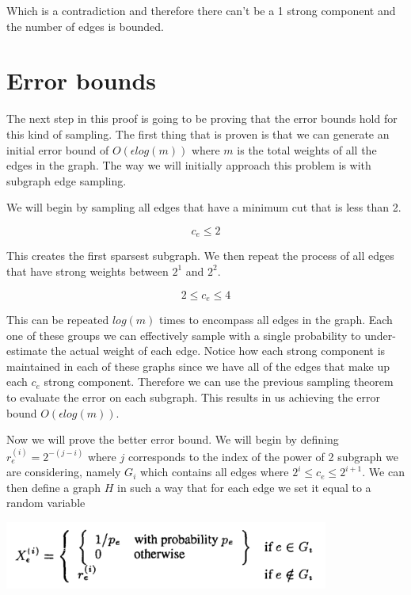 \documentclass[11pt]{article}
\begin{document}
Which is a contradiction and therefore there can't be a 1 strong component and the number of edges is bounded. 

\section{Error bounds}

The next step in this proof is going to be proving that the error bounds hold for this kind of sampling. The first thing that is proven is that we can generate an initial error bound of $O(\epsilon log(m))$ where $m$ is the total weights of all the edges in the graph. The way we will initially approach this problem is with subgraph edge sampling.

We will begin by sampling all edges that have a minimum cut that is less than 2.

\begin{equation}
    c_e \leq 2
\end{equation}

This creates the first sparsest subgraph. We then repeat the process of all edges that have strong weights between $2^1$ and $2^2$.

\begin{equation}
    2 \leq c_e \leq 4
\end{equation}

This can be repeated $log(m)$ times to encompass all edges in the graph. Each one of these groups we can effectively sample with a single probability to under-estimate the actual weight of each edge. Notice how each strong component is maintained in each of these graphs since we have all of the edges that make up each $c_e$ strong component. Therefore we can use the previous sampling theorem to evaluate the error on each subgraph. This results in us achieving the error bound $O(\epsilon log(m))$.

Now we will prove the better error bound. We will begin by defining $r_e^{(i)} = 2^{-(j-i)}$ where $j$ corresponds to the index of the power of 2 subgraph we are considering, namely $G_i$ which contains all edges where $2^i \leq c_e \leq 2^{i+1}$. We can then define a graph $H$ in such a way that for each edge we set it equal to a random variable 

\begin{center}
\includegraphics[width=0.8\textwidth]{figures/random_edge_variable.png}
\end{center}
\end{document}
